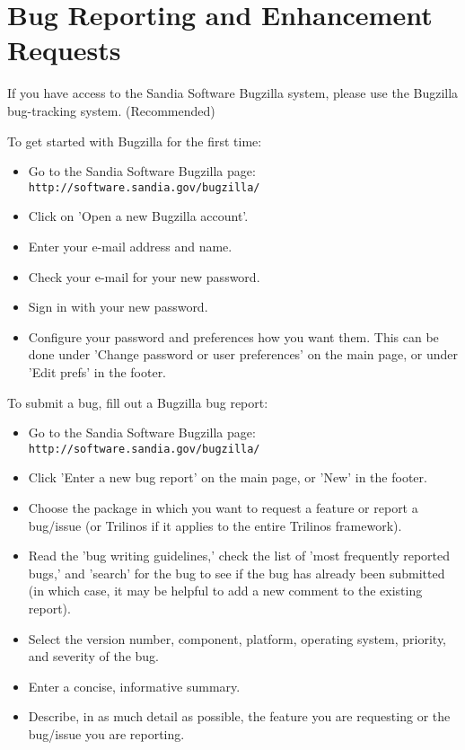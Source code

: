 \section{Bug Reporting and Enhancement Requests}

If you have access to the Sandia Software Bugzilla system, please use
the Bugzilla bug-tracking system. (Recommended) 

To get started with Bugzilla for the first time:
\begin{itemize}
\item Go to the Sandia Software Bugzilla page: 
  {\tt http://software.sandia.gov/bugzilla/}
\item Click on 'Open a new Bugzilla account'.
\item Enter your e-mail address and name.
\item Check your e-mail for your new password.
\item Sign in with your new password.
\item Configure your password and preferences how you want them. This
  can be done under 'Change password or user preferences' on the main
  page, or under 'Edit prefs' in the footer. 
\end{itemize}

To submit a bug, fill out a Bugzilla bug report:
\begin{itemize}
\item Go to the Sandia Software Bugzilla page:
  {\tt http://software.sandia.gov/bugzilla/}
\item Click 'Enter a new bug report' on the main page, or 'New' in the
  footer. 
\item Choose the package in which you want to request a feature or
  report a bug/issue (or Trilinos if it applies to the entire Trilinos
  framework). 
\item Read the 'bug writing guidelines,' check the list of 'most
  frequently reported bugs,' and 'search' for the bug to see if the
  bug has already been submitted (in which case, it may be helpful to
  add a new comment to the existing report). 
\item Select the version number, component, platform, operating
  system, priority, and severity of the bug. 
\item Enter a concise, informative summary. 
\item Describe, in as much detail as possible, the feature you are
  requesting or the bug/issue you are reporting. 
\end{itemize}

